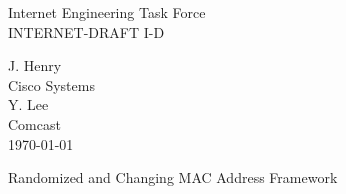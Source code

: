\documentclass[10pt]{article}
\newcommand{\rfcId}{I-D}
\newcommand{\rfcTitle}{Randomized and Changing MAC Address Framework}
\newcommand{\rfcDate}{\today}
\begin{document}
\begin{multicols}{2}
	\begin{flushleft}
		Internet Engineering Task Force \\
		INTERNET-DRAFT \rfcId
	\end{flushleft}
\columnbreak
	\begin{flushright}
		J. Henry \\
		Cisco Systems \\
		Y. Lee \\
		Comcast \\
		\rfcDate
	\end{flushright}
\end{multicols}

\vspace{1in} { \center \rfcTitle \\ } \vspace{1in}

\begin{abstract}
	To limit the association between a device traffic and its user, client vendors have started implementing MAC address rotation. When such rotation happens, sessions may break, which may affect network efficiency and the user experience. This document lists network services that may be affected by such rotation, and examines solutions to maintain user privacy while preserving user quality of experience and network operation efficiency. 
\end{abstract}
\pagebreak

\tableofcontents
\pagebreak
\end{document}
